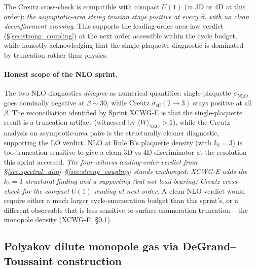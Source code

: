 \documentclass[11pt]{article}
\begin{document}
The Creutz cross-check is compatible with compact $U(1)$ (in 3D or 4D at this order): \emph{the asymptotic-area
string tension stays positive at every $\beta$, with no clean deconfinement
crossing}. This supports the leading-order area-law verdict
(\S\ref{sec:strong_coupling}) at the next order accessible within the cycle
budget, while honestly acknowledging that the single-plaquette diagnostic
is dominated by truncation rather than physics.

\paragraph{Honest scope of the NLO sprint.} The two NLO diagnostics
\emph{disagree} as numerical quantities: single-plaquette $\sigma_\text{NLO}$
goes nominally negative at $\beta\sim 30$, while Creutz
$\sigma_\text{eff}(2\to 3)$ stays positive at all $\beta$. The reconciliation
identified by Sprint XCWG-E is that the single-plaquette result is a
truncation artifact (witnessed by $\langle W\rangle_\text{NLO}>1$), while
the Creutz analysis on asymptotic-area pairs is the structurally cleaner
diagnostic, supporting the LO verdict. NLO at Rule B's plaquette density
(with $k_\delta=3$) is too truncation-sensitive to give a clean 3D-vs-4D
discriminator at the resolution this sprint accessed. \emph{The four-witness
leading-order verdict from \S\ref{sec:spectral_dim}--\S\ref{sec:strong_coupling}
stands unchanged; XCWG-E adds the $k_\delta=3$ structural finding and a
supporting (but not load-bearing) Creutz cross-check for the compact-$U(1)$
reading at next order.} A clean NLO verdict would require either a much
larger cycle-enumeration budget than this sprint's, or a different
observable that is less sensitive to surface-enumeration truncation --
the monopole density (XCWG-F, \S\ref{sec:monopole_density}).

\subsection{Polyakov dilute monopole gas via DeGrand--Toussaint construction}
\label{sec:monopole_density}
\end{document}
